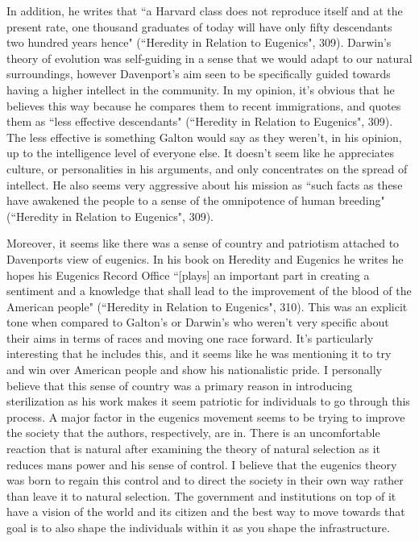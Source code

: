 \documentclass[11pt, oneside]{article}
\begin{document}
\par In addition, he writes that ``a Harvard class does not reproduce itself and at the present rate, one thousand graduates of today will have only fifty descendants two hundred years hence" (``Heredity in Relation to Eugenics", 309). Darwin's theory of evolution was self-guiding in a sense that we would adapt to our natural surroundings, however Davenport's aim seen to be specifically guided towards having a higher intellect in the community. In my opinion, it's obvious that he believes this way because he compares them to recent immigrations, and quotes them as ``less effective descendants" (``Heredity in Relation to Eugenics", 309). The less effective is something Galton would say as they weren't, in his opinion, up to the intelligence level of everyone else. It doesn't seem like he appreciates culture, or personalities in his arguments, and only concentrates on the spread of intellect. He also seems very aggressive about his mission as ``such facts as these have awakened the people to a sense of the omnipotence of human breeding" (``Heredity in Relation to Eugenics", 309). 

\par Moreover, it seems like there was a sense of country and patriotism attached to Davenports view of eugenics. In his book on Heredity and Eugenics he writes he hopes his Eugenics Record Office ``[plays] an important part in creating a sentiment and a knowledge that shall lead to the improvement of the blood of the American people" (``Heredity in Relation to Eugenics", 310). This was an explicit tone when compared to Galton's or Darwin's who weren't very specific about their aims in terms of races and moving one race forward. It's particularly interesting that he includes this, and it seems like he was mentioning it to try and win over American people and show his nationalistic pride. 
I personally believe that this sense of country was a primary reason in introducing sterilization as his work makes it seem patriotic for individuals to go through this process. A major factor in the eugenics movement seems to be trying to improve the society that the authors, respectively, are in. There is an uncomfortable reaction that is natural after examining the theory of natural selection as it reduces mans power and his sense of control. I believe that the eugenics theory was born to regain this control and to direct the society in their own way rather than leave it to natural selection. The government and institutions on top of it have a vision of the world and its citizen and the best way to move towards that goal is to also shape the individuals within it as you shape the infrastructure. 
\end{document}
